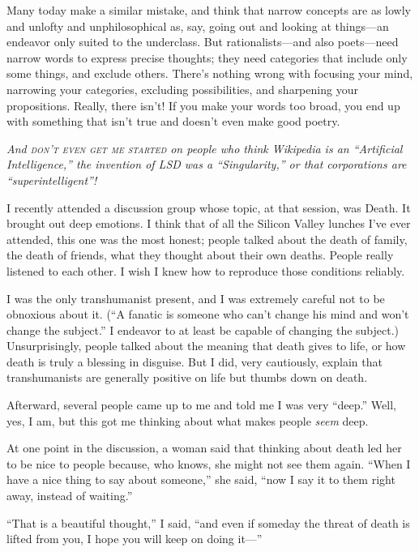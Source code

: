 {
 Many today make a similar mistake, and think that narrow concepts
are as lowly and unlofty and unphilosophical as, say, going out and
looking at things---an endeavor only suited to the underclass. But
rationalists---and also poets---need narrow words to express precise
thoughts; they need categories that include only some things, and
exclude others. There's nothing wrong with focusing
your mind, narrowing your categories, excluding possibilities, and
sharpening your propositions. Really, there isn't! If
you make your words too broad, you end up with something that
isn't true and doesn't even make good
poetry.}

{
 \textit{And \textsc{don't even get me started} on people
who think Wikipedia is an ``Artificial
Intelligence,'' the invention of LSD was a
``Singularity,'' or that
corporations are
``superintelligent''!}}

\myendsectiontext


\bigskip


{
 I recently attended a discussion group whose topic, at that
session, was Death. It brought out deep emotions. I think that of all
the Silicon Valley lunches I've ever attended, this one
was the most honest; people talked about the death of family, the death
of friends, what they thought about their own deaths. People really
listened to each other. I wish I knew how to reproduce those conditions
reliably. }

{
 I was the only transhumanist present, and I was extremely careful
not to be obnoxious about it. (``A fanatic is someone
who can't change his mind and won't
change the subject.'' I endeavor to at least be
capable of changing the subject.) Unsurprisingly, people talked about
the meaning that death gives to life, or how death is truly a blessing
in disguise. But I did, very cautiously, explain that transhumanists
are generally positive on life but thumbs down on death.}

{
 Afterward, several people came up to me and told me I was very
``deep.'' Well, yes, I am, but this
got me thinking about what makes people \textit{seem} deep.}

{
 At one point in the discussion, a woman said that thinking about
death led her to be nice to people because, who knows, she might not
see them again. ``When I have a nice thing to say
about someone,'' she said, ``now I
say it to them right away, instead of waiting.''}

{
 ``That is a beautiful
thought,'' I said, ``and even if
someday the threat of death is lifted from you, I hope you will keep on
doing it---''}


